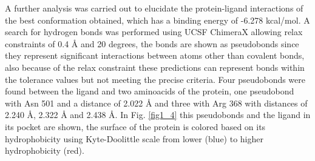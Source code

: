 \documentclass[12pt]{article}
\begin{document}
	A further analysis was carried out to elucidate the protein-ligand interactions of the best conformation obtained, which has a binding energy of -6.278 kcal/mol. A search for hydrogen bonds was performed using UCSF ChimeraX allowing relax constraints of 0.4 \r{A} and 20 degrees, the bonds are shown as pseudobonds since they represent significant interactions between atoms other than covalent bonds, also because of the relax constraint these predictions can represent bonds within the tolerance values but not meeting the precise criteria. \cite{chimera,chimera_2,hbond} Four pseudobonds were found between the ligand and two aminoacids of the protein, one pseudobond with Asn 501 and a distance of 2.022 \r{A} and three with Arg 368 with distances of 2.240 \r{A}, 2.322 \r{A} and 2.438 \r{A}. In Fig. \ref{fig1_4} this pseudobonds and the ligand in its pocket are shown, the surface of the protein is colored based on its hydrophobicity using Kyte-Doolittle scale from lower (blue) to higher hydrophobicity (red).
\end{document}
